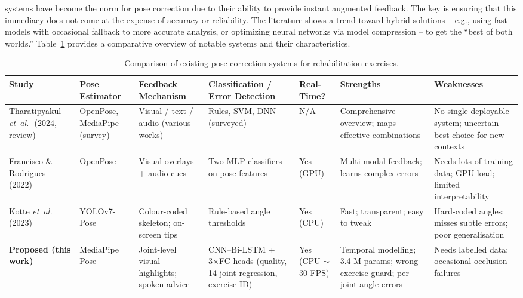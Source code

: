 \documentclass{article}
\begin{document}
systems have become the norm for pose correction due to their ability to provide instant augmented feedback. The key is ensuring that this immediacy does not come at the expense of accuracy or reliability. The literature shows a trend toward hybrid solutions – e.g., using fast models with occasional fallback to more accurate analysis, or optimizing neural networks via model compression – to get the “best of both worlds.” Table~\ref{tab:comparison} provides a comparative overview of notable systems and their characteristics. 

\begin{table}[t]
  \caption{Comparison of existing pose-correction systems for rehabilitation exercises.}
  \label{tab:comparison}
  \centering\small            %
  \setlength{\tabcolsep}{3pt} %
  \renewcommand{\arraystretch}{1.15}
  \begin{tabular}{|p{2.8cm}|p{2cm}|p{2.4cm}|p{2.4cm}|p{1.2cm}|p{2.6cm}|p{2.6cm}|}
    \hline
    \textbf{Study} &
    \textbf{Pose Estimator} &
    \textbf{Feedback Mechanism} &
    \textbf{Classification / Error Detection} &
    \textbf{Real-Time?} &
    \textbf{Strengths} &
    \textbf{Weaknesses} \\ \hline
    
    Tharatipyakul \textit{et~al.}~\cite{Tharatipyakul2024Review}\,(2024, review) &
    OpenPose, MediaPipe (survey) &
    Visual / text / audio (various works) &
    Rules, SVM, DNN (surveyed) &
    N/A &
    Comprehensive overview; maps effective combinations &
    No single deployable system; uncertain best choice for new contexts \\ \hline
    
    Francisco \& Rodrigues~\cite{Francisco2022}\,(2022) &
    OpenPose &
    Visual overlays + audio cues &
    Two MLP classifiers on pose features &
    Yes (GPU) &
    Multi-modal feedback; learns complex errors &
    Needs lots of training data; GPU load; limited interpretability \\ \hline
    
    Kotte \textit{et~al.}~\cite{Kotte2023}\,(2023) &
    YOLOv7-Pose &
    Colour-coded skeleton; on-screen tips &
    Rule-based angle thresholds &
    Yes (CPU) &
    Fast; transparent; easy to tweak &
    Hard-coded angles; misses subtle errors; poor generalisation \\ \hline
    
    \textbf{Proposed (this work)} &
    MediaPipe Pose &
    Joint-level visual highlights; spoken advice &
    CNN–Bi-LSTM  + 3×FC heads (quality, 14-joint regression, exercise ID) &
    Yes (CPU $\sim$30 FPS) &
    Temporal modelling; 3.4 M params; wrong-exercise guard; per-joint angle errors &
    Needs labelled data; occasional occlusion failures \\ \hline
  \end{tabular}
\end{table}
\end{document}
